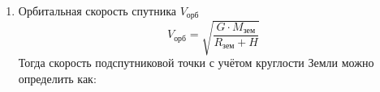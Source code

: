 \solutionSection

\begin{enumerate}
    \item Орбитальная скорость спутника $V_\text{орб}$
    $$V_\text{орб}=\sqrt{\frac{G \cdot M_\text{зем}}{R_\text{зем}+H}}$$
    Тогда скорость подспутниковой точки с учётом круглости Земли можно определить как:
    
\end{enumerate}